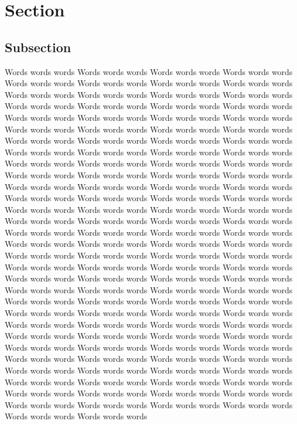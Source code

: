 \section {Section}
\subsection {Subsection}

Words words words
Words words words
Words words words
Words words words
Words words words
Words words words
Words words words
Words words words
Words words words
Words words words
Words words words
Words words words
Words words words
Words words words
Words words words
Words words words
Words words words
Words words words
Words words words
Words words words
Words words words
Words words words
Words words words
Words words words
Words words words
Words words words
Words words words
Words words words
Words words words
Words words words
Words words words
Words words words
Words words words
Words words words
Words words words
Words words words
Words words words
Words words words
Words words words
Words words words
Words words words
Words words words
Words words words
Words words words
Words words words
Words words words
Words words words
Words words words
Words words words
Words words words
Words words words
Words words words
Words words words
Words words words
Words words words
Words words words
Words words words
Words words words
Words words words
Words words words
Words words words
Words words words
Words words words
Words words words
Words words words
Words words words
Words words words
Words words words
Words words words
Words words words
Words words words
Words words words
Words words words
Words words words
Words words words
Words words words
Words words words
Words words words
Words words words
Words words words
Words words words
Words words words
Words words words
Words words words
Words words words
Words words words
Words words words
Words words words
Words words words
Words words words
Words words words
Words words words
Words words words
Words words words
Words words words
Words words words
Words words words
Words words words
Words words words
Words words words
Words words words
Words words words
Words words words
Words words words
Words words words
Words words words
Words words words
Words words words
Words words words
Words words words
Words words words
Words words words
Words words words
Words words words
Words words words
Words words words
Words words words
Words words words
Words words words
Words words words
Words words words
Words words words
